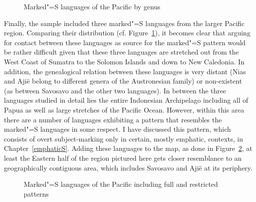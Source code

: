\begin{figure}[h,t,b] \centering {} \caption{Marked"=S languages of the Pacific by genus}\label{MapPac}
\end{figure}

Finally, the sample included three marked"=S languages from the larger Pacific region. 
Comparing their distribution (cf. Figure~\ref{MapPac}), it becomes clear that arguing for contact between these languages as source for the marked"=S pattern would be rather difficult given that these three languages are stretched out from the West Coast of Sumatra to the Solomon Islands and down to New Caledonia. 
In addition, the genealogical relation between these languages is very distant (Nias and Aji\"e belong to different genera of the Austronesian family) or non-existent (as between Savosavo and the other two languages). 
In between the three languages studied in detail lies the entire Indonesian Archipelago including all of Papua as well as large stretches of the Pacific Ocean.
However, within this area there are a number of languages exhibiting a pattern that resembles the marked"=S languages in some respect. 
I have discussed this pattern, which consists of overt subject-marking only in certain, mostly emphatic, contexts, in Chapter~\ref{emphaticS}.
Adding these languages to the map, as done in Figure~\ref{MapPacAll}, at least the Eastern half of the region pictured here gets closer resemblance to an geographically contiguous area, which includes Savosavo and Aji\"e at its periphery. 

\begin{figure}[h,t,b] \centering {} \caption{Marked"=S languages of the Pacific including full and restricted patterns}\label{MapPacAll}
\end{figure}


